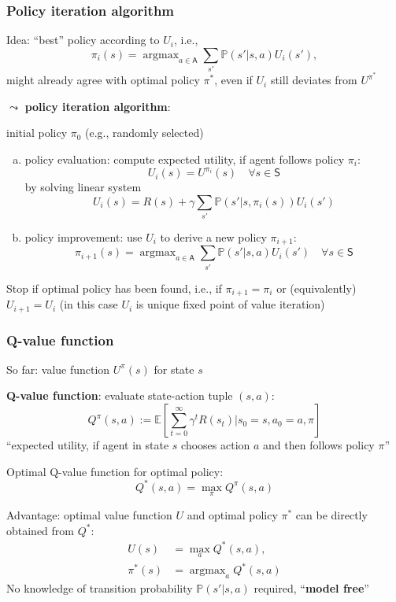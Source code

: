 \documentclass[t]{beamer}
\DeclareMathOperator*{\argmax}{argmax}
\begin{document}
\begin{frame}
\frametitle{Policy iteration algorithm}
Idea: ``best'' policy according to $U_i$, i.e.,
\[
\pi_i(s) = \argmax_{a \in \mathsf{A}} \sum_{s'} \mathbb{P}(s' \vert s,a) U_i(s'),
\]
might already agree with optimal policy $\pi^*$, even if $U_i$ still deviates from $U^{\pi^*}$

$\leadsto$ \textbf{policy iteration algorithm}:
\begin{algorithmic}
\Require initial policy $\pi_0$ (e.g., randomly selected)
    \begin{enumerate}[(a)]
    \item policy evaluation: compute expected utility, if agent follows policy $\pi_i$:
    \[
    U_i(s) = U^{\pi_i}(s) \quad \forall s \in \mathsf{S}
    \]
    by solving linear system
    \[
    U_i(s) = R(s) + \gamma \sum_{s'} \mathbb{P}(s' \vert s, \pi_i(s)) U_i(s')
    \]
    \item policy improvement: use $U_i$ to derive a new policy $\pi_{i+1}$:
    \[
    \pi_{i+1}(s) = \argmax_{a \in \mathsf{A}} \sum_{s'} \mathbb{P}(s' \vert s,a) U_i(s') \quad \forall s \in \mathsf{S}
    \]
    \end{enumerate}
    Stop if optimal policy has been found, i.e., if $\pi_{i+1} = \pi_i$ or (equivalently) $U_{i+1} = U_i$ (in this case $U_i$ is unique fixed point of value iteration)
\EndFor
\end{algorithmic}
\end{frame}



\begin{frame}
\frametitle{Q-value function}
So far: value function $U^\pi(s)$ for state $s$

\textbf{Q-value function}: evaluate state-action tuple $(s, a)$:
\[
Q^\pi(s,a) := \mathbb{E}\!\left[ \sum_{t=0}^\infty \gamma^t R(s_t) \Big\vert s_0 = s, a_0 = a, \pi \right]
\]
``expected utility, if agent in state $s$ chooses action $a$ and then follows policy $\pi$''

Optimal Q-value function for optimal policy:
\[
Q^*(s,a) = \max_{\pi} Q^\pi(s,a)
\]

Advantage: optimal value function $U$ and optimal policy $\pi^*$ can be directly obtained from $Q^*$:
\begin{align*}
U(s)     &= \max_a Q^*(s,a), \\
\pi^*(s) &= \argmax_a Q^*(s,a)
\end{align*}
No knowledge of transition probability $\mathbb{P}(s' \vert s,a)$ required, ``\textbf{model free}''
\end{frame}
\end{document}
